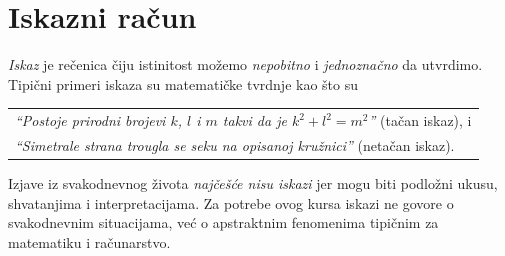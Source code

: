 \chapter{Iskazni ra\v cun}


\emph{Iskaz} je re\v cenica \v ciju istinitost mo\v zemo \emph{nepobitno} i \emph{jednozna\v cno} da utvrdimo.
Tipi\v cni primeri iskaza su matemati\v cke tvrdnje kao \v sto su
\begin{center}
  \begin{tabular}{l}
    \textit{\enquote{Postoje prirodni brojevi $k$, $l$ i $m$ takvi da je $k^2 + l^2 = m^2$}} (ta\v can iskaz), i\\
    \textit{\enquote{Simetrale strana trougla se seku na opisanoj kru\v znici}} (neta\v can iskaz).
  \end{tabular}
\end{center}
Izjave iz svakodnevnog \v zivota \emph{naj\v ce\v s\'ce nisu iskazi} jer mogu biti podlo\v zni ukusu, shvatanjima i interpretacijama.
Za potrebe ovog kursa iskazi ne govore o sva\-ko\-dnev\-nim situacijama, ve\'c o apstraktnim fenomenima tipi\v cnim za matematiku i ra\v cunarstvo.

